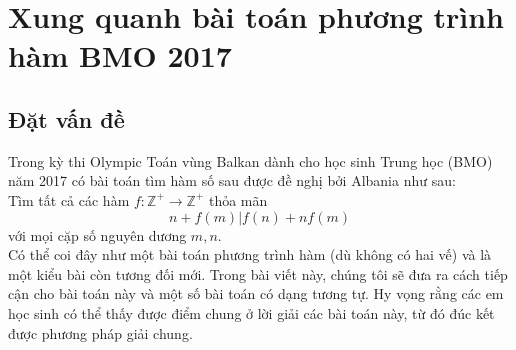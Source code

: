 \section{Xung quanh bài toán phương trình hàm BMO 2017}
\begin{center}
	\textbf{\color{violet}{Võ Quốc Bá Cẩn\\
			(Archimedes Academy, Hà Nội)}}
\end{center}

\subsection{Đặt vấn đề}
Trong kỳ thi Olympic Toán vùng Balkan dành cho học sinh Trung học (BMO) năm 2017 có bài
toán tìm hàm số sau được đề nghị bởi Albania như sau:\\
Tìm tất cả các hàm  $f \colon \mathbb{Z}^+ \rightarrow \mathbb{Z}^+$ thỏa mãn
$$n+f(m)|f(n)+n f(m) $$
với mọi cặp số nguyên dương $m,n$. \\
Có thể coi đây như một bài toán phương trình hàm (dù không có hai vế) và là một kiểu bài còn tương đối mới. Trong bài viết này, chúng tôi sẽ đưa ra cách tiếp cận cho bài toán này và một số bài toán có dạng tương tự. Hy vọng rằng các em học sinh có thể thấy được điểm chung ở lời giải các bài toán này, từ đó đúc kết được phương pháp giải chung.
